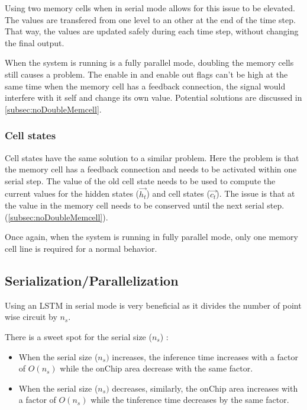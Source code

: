 Using two memory cells when in serial mode allows for this issue to be elevated. The values are transfered from one level to an other at the end of the time step. That way, the values are updated safely during each time step, without changing the final output.

When the system is running is a fully parallel mode, doubling the memory cells still causes a problem. The enable in and enable out flags can't be high at the same time when the memory cell has a feedback connection, the signal would interfere with it self and change its own value. Potential solutions are discussed in \cref{subsec:noDoubleMemcell}.

\subsubsection{Cell states}

Cell states have the same solution to a similar problem. Here the problem is that the memory cell has a feedback connection and needs to be activated within one serial step. The value of the old cell state needs to be used to compute the current values for the hidden states ($\overrightarrow{h_t}$) and cell states ($\overrightarrow{c_t}$). The issue is that at the value in the memory cell needs to be conserved until the next serial step.  (\cref{subsec:noDoubleMemcell}).

Once again, when the system is running in fully parallel mode, only one memory cell line is required for a normal behavior.

\subsection{Serialization/Parallelization}
\label{subsec:serpar}

Using an \ac{LSTM} in serial mode is very beneficial as it divides the number of point wise circuit by $n_s$.

There is a sweet spot for the serial size ($n_s$) :

\begin{itemize}
  \item When the serial size ($n_s)$ increases, the inference time increases with a factor of $O(n_s)$ while the onChip area decrease with the same factor.
  \item When the serial size ($n_s)$ decreases, similarly, the onChip area increases with a factor of $O(n_s)$ while the tinference time decreases by the same factor.
\end{itemize}

